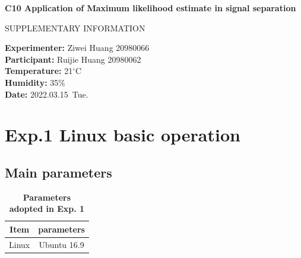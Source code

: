 \documentclass[12pt,a4paper,UTF8]{article}
\begin{document}

\begin{center}
\LARGE\textbf{C10 Application of Maximum likelihood estimate in signal separation}

\vspace{0.5em}
\large{SUPPLEMENTARY INFORMATION}
\end{center}

\noindent
\textbf{Experimenter:} Ziwei Huang 20980066 \\
\textbf{Participant:} Ruijie Huang 20980062 \\
\textbf{Temperature:} 21$^{\circ}$C \\
\textbf{Humidity:} 35\% \\
\textbf{Date:} 2022.03.15~Tue.


\tableofcontents
\newpage

\section{Exp.1 Linux basic operation}
    \subsection{Main parameters}
    \begin{table}[htbp]
        \centering
            \begin{tabular}{cc}
                \toprule
                Item    &parameters  \\
                \midrule              
                Linux   &Ubuntu 16.9 \\
                \bottomrule
            \end{tabular}
            \caption{\textbf{Parameters adopted in Exp. 1}}
            \label{tab:1.1}
    \end{table}	
\end{document}
